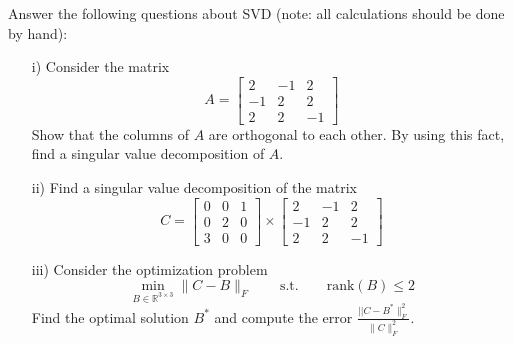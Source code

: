 \begin{homeworkProblem}

    Answer the following questions about SVD (note: all calculations 
    should be done by hand):
    \begin{itemize} 
        \item [i)] Consider the matrix
        \begin{equation}
            A=\left[\begin{array}{ccc} 2 & -1 & 2\\ -1 & 2 & 2\\ 
            2 & 2 & -1\end{array}\right]
        \end{equation}
        Show that the columns of $A$ are orthogonal to each other. By using 
        this fact, find a singular value decomposition of $A$.

        \item [ii)] Find a singular value decomposition of the matrix 
        \begin{equation}
            C= \left[\begin{array}{ccc} 0 & 0 & 1\\ 0 & 2 & 0\\3 & 0& 0
            \end{array}\right]\times \left[\begin{array}{ccc} 2 & -1 & 2\\ 
            -1 & 2 & 2\\ 2 & 2 & -1\end{array}\right]
        \end{equation}

        \item [iii)] Consider the optimization problem
        \begin{equation}
            \min_{B\in\mathbb R^{3\times3}} \|C-B\|_F\qquad\text{s.t.}\qquad 
            \text{rank}(B)\leq 2
        \end{equation}
        Find the optimal solution $B^*$ and compute the error 
        $\frac{||C-B^*\|_F^2}{\|C\|_F^2}$.

    \end{itemize}

    \begin{solution}
    \end{solution}

\end{homeworkProblem}